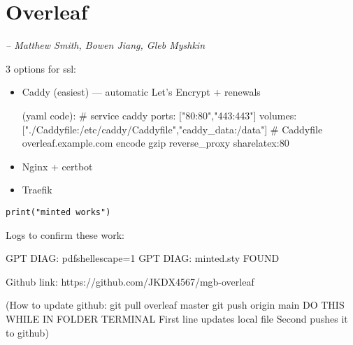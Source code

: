 \chapter{Overleaf}
\small{\textit{-- Matthew Smith, Bowen Jiang, Gleb Myshkin}}
\label{Chapter::Overleaf}


3 options for ssl:

\begin{itemize}
        \item Caddy (easiest) — automatic Let’s Encrypt + renewals

        (yaml code): # service caddy
        ports: ["80:80","443:443"]
        volumes: ["./Caddyfile:/etc/caddy/Caddyfile","caddy_data:/data"]
        # Caddyfile
        overleaf.example.com {
          encode gzip
          reverse_proxy sharelatex:80
        }
        \item Nginx + certbot
        \item Traefik
    \end{itemize}

\begin{verbatim}
print("minted works")
\end{verbatim}


Logs to confirm these work:

GPT DIAG: pdfshellescape=1
GPT DIAG: minted.sty FOUND



Github link: https://github.com/JKDX4567/mgb-overleaf

(How to update github: 
git pull overleaf master
git push origin main
DO THIS WHILE IN FOLDER TERMINAL
First line updates local file
Second pushes it to github)

